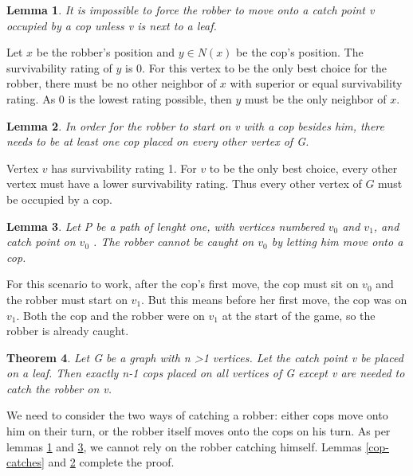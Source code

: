 \documentclass{article}
\newtheorem{theorem}{Theorem}[section]
\newtheorem{lemma}[theorem]{Lemma}
\newenvironment{proof}[1][Proof]{\begin{trivlist}
\item[\hskip \labelsep {\bfseries #1}]}{\end{trivlist}}
\begin{document}
\begin{lemma}
\label{robber-catches}
It is impossible to force the robber to move onto a catch point v occupied by a cop unless v is next to a leaf.
\end{lemma}
\begin{proof}
Let $x$ be the robber's position and $y \in N(x)$ be the cop's position. The survivability rating of $y$ is 0. For this vertex to be the only best choice for the robber, there must be no other neighbor of $x$ with superior or equal survivability rating. As 0 is the lowest rating possible, then $y$ must be the only neighbor of $x$.
\end{proof}
\begin{lemma}
\label{robber-starts-wherever}
In order for the robber to start on v with a cop besides him, there needs to be at least one cop placed on every other vertex of G.
\end{lemma}
\begin{proof}
Vertex $v$ has survivability rating 1. For $v$ to be the only best choice, every other vertex must have a lower survivability rating. Thus every other vertex of $G$ must be occupied by a cop.
\end{proof}
\begin{lemma}
\label{path-1}
Let P be a path of lenght one, with vertices numbered $v_0$ and $v_1$, and catch point on $v_0$ . The robber cannot be caught on $v_0$ by letting him move onto a cop. 
\end{lemma}
\begin{proof}
For this scenario to work, after the cop's first move, the cop must sit on $v_0$ and the robber must start on $v_1$. But this means before her first move, the cop was on $v_1$. Both the cop and the robber were on $v_1$ at the start of the game, so the robber is already caught. 
\end{proof}
\begin{theorem}
\label{path-distance-0}
Let G be a graph with n >1 vertices. Let the catch point v be placed on a leaf. Then exactly n-1 cops placed on all vertices of G except v are needed to catch the robber on v.
\end{theorem}
\begin{proof} We need to consider the two ways of catching a robber: either cops move onto him on their turn, or the robber itself moves onto the cops on his turn. As per lemmas \ref{robber-catches} and \ref{path-1}, we cannot rely on the robber catching himself. Lemmas \ref{cop-catches} and \ref{robber-starts-wherever} complete the proof.

\end{proof}
\end{document}
